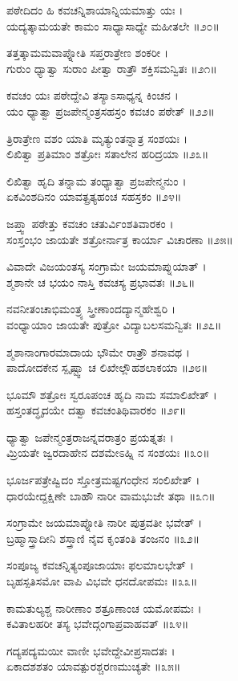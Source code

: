 ಪಠೇದಿದಂ ಹಿ ಕವಚನ್ನಿಶಾಯಾನ್ನಿಯಮಾತ್ತು ಯಃ ।\\
ಯದ್ಯತ್ಕಾಮಯತೇ ಕಾಮಂ ಸಾಧ್ಯಾಸಾಧ್ಯೇ ಮಹೀತಲೇ ॥೨೦॥

ತತ್ತತ್ಕಾಮಮವಾಪ್ನೋತಿ ಸಪ್ತರಾತ್ರೇಣ ಶಂಕರೀ ।\\
ಗುರುಂ ಧ್ಯಾತ್ವಾ ಸುರಾಂ ಪೀತ್ವಾ ರಾತ್ರೌ ಶಕ್ತಿಸಮನ್ವಿತಃ ॥೨೧॥

ಕವಚಂ ಯಃ ಪಠೇದ್ದೇವಿ ತಸ್ಯಾಽಸಾಧ್ಯನ್ನ ಕಿಂಚನ ।\\
ಯಂ ಧ್ಯಾತ್ವಾ ಪ್ರಜಪೇನ್ಮಂತ್ರಸಹಸ್ರಂ ಕವಚಂ ಪಠೇತ್ ॥೨೨॥

ತ್ರಿರಾತ್ರೇಣ ವಶಂ ಯಾತಿ ಮೃತ್ಯುಂತನ್ನಾತ್ರ ಸಂಶಯಃ ।\\
ಲಿಖಿತ್ವಾ ಪ್ರತಿಮಾಂ ಶತ್ರೋಃ ಸತಾಲೇನ ಹರಿದ್ರಯಾ ॥೨೩॥

ಲಿಖಿತ್ವಾ ಹೃದಿ ತನ್ನಾಮ ತಂಧ್ಯಾತ್ವಾ ಪ್ರಜಪೇನ್ಮನುಂ ।\\
ಏಕವಿಂಶದಿನಂ ಯಾವತ್ಪ್ರತ್ಯಹಂಚ ಸಹಸ್ರಕಂ ॥೨೪॥

ಜಪ್ತ್ವಾ ಪಠೇತ್ತು ಕವಚಂ ಚತುರ್ವಿಂಶತಿವಾರಕಂ ।\\
ಸಂಸ್ತಂಭಂ ಜಾಯತೇ ಶತ್ರೋರ್ನಾತ್ರ ಕಾರ್ಯಾ ವಿಚಾರಣಾ ॥೨೫॥

ವಿವಾದೇ ವಿಜಯಂತಸ್ಯ ಸಂಗ್ರಾಮೇ ಜಯಮಾಪ್ನುಯಾತ್ ।\\
ಶ್ಮಶಾನೇ ಚ ಭಯಂ ನಾಸ್ತಿ ಕವಚಸ್ಯ ಪ್ರಭಾವತಃ ॥೨೬॥

ನವನೀತಂಚಾಭಿಮಂತ್ರ್ಯ ಸ್ತ್ರೀಣಾಂದದ್ಯಾನ್ಮಹೇಶ್ವರಿ ।\\
ವಂಧ್ಯಾಯಾಂ ಜಾಯತೇ ಪುತ್ರೋ ವಿದ್ಯಾಬಲಸಮನ್ವಿತಃ ॥೨೭॥

ಶ್ಮಶಾನಾಂಗಾರಮಾದಾಯ ಭೌಮೇ ರಾತ್ರೌ ಶನಾವಥ ।\\
ಪಾದೋದಕೇನ ಸ್ಪೃಷ್ಟ್ವಾ ಚ ಲಿಖೇಲ್ಲೌಹಶಲಾಕಯಾ ॥೨೮॥

ಭೂಮೌ ಶತ್ರೋಃ ಸ್ವರೂಪಂಚ ಹೃದಿ ನಾಮ ಸಮಾಲಿಖೇತ್ ।\\
ಹಸ್ತಂತದ್ಧೃದಯೇ ದತ್ವಾ ಕವಚಂತಿಥಿವಾರಕಂ ॥೨೯॥

ಧ್ಯಾತ್ವಾ ಜಪೇನ್ಮಂತ್ರರಾಜನ್ನವರಾತ್ರಂ ಪ್ರಯತ್ನತಃ ।\\
ಮ್ರಿಯತೇ ಜ್ವರದಾಹೇನ ದಶಮೇಽಹ್ನಿ ನ ಸಂಶಯಃ ॥೩೦॥

ಭೂರ್ಜಪತ್ರೇಷ್ವಿದಂ ಸ್ತೋತ್ರಮಷ್ಟಗಂಧೇನ ಸಂಲಿಖೇತ್ ।\\
ಧಾರಯೇದ್ದಕ್ಷಿಣೇ ಬಾಹೌ ನಾರೀ ವಾಮಭುಜೇ ತಥಾ ॥೩೧॥

ಸಂಗ್ರಾಮೇ ಜಯಮಾಪ್ನೋತಿ ನಾರೀ ಪುತ್ರವತೀ ಭವೇತ್ ।\\
ಬ್ರಹ್ಮಾಸ್ತ್ರಾದೀನಿ ಶಸ್ತ್ರಾಣಿ ನೈವ ಕೃಂತಂತಿ ತಂಜನಂ ॥೩೨॥

ಸಂಪೂಜ್ಯ ಕವಚನ್ನಿತ್ಯಂಪೂಜಾಯಾಃ ಫಲಮಾಲಭೇತ್ ।\\
ಬೃಹಸ್ಪತಿಸಮೋ ವಾಪಿ ವಿಭವೇ ಧನದೋಪಮಃ ॥೩೩॥

ಕಾಮತುಲ್ಯಶ್ಚ ನಾರೀಣಾಂ ಶತ್ರೂಣಾಂಚ ಯಮೋಪಮಃ ।\\
ಕವಿತಾಲಹರೀ ತಸ್ಯ ಭವೇದ್ಗಂಗಾಪ್ರವಾಹವತ್ ॥೩೪॥

ಗದ್ಯಪದ್ಯಮಯೀ ವಾಣೀ ಭವೇದ್ದೇವೀಪ್ರಸಾದತಃ ।\\
ಏಕಾದಶಶತಂ ಯಾವತ್ಪುರಶ್ಚರಣಮುಚ್ಯತೇ ॥೩೫॥

